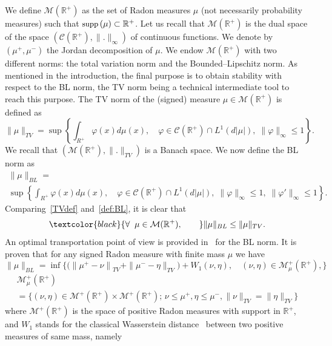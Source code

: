 \documentclass[10pt]{amsart}
\theoremstyle{definition}\newtheorem{defi}[theo]{Definition}\newtheorem{rema}[theo]{Remark}\newtheorem{exam}[theo]{Example}\newtheorem{exem}[theo]{Example}\newtheorem{nota}[theo]{Notation}
\newcommand*\dst{\displaystyle}
\newcommand*\R{\mathbb{R}}
\newcommand*\M{\mathcal{M}}
\newcommand{\clC}{\mathcal{C}}
\newcommand{\comMD}[1]{\textcolor{black}{#1}}
\newcommand*\supp{{\mbox{\small\rm supp}}\,}
\let\oldforall\forall
\renewcommand*{\forall}{\mathrel{\oldforall}}
\begin{document}
We define $\M(\R^+)$ as the set of Radon measures $\mu$ (not necessarily probability measures) such that $\supp(\mu) \subset \R^+$. Let us recall that $\M(\R^+)$ is the dual space of the space $(\clC(\R^+),\|.\|_{\infty})$ of continuous functions. We denote by $(\mu^+,\mu^-)$ the Jordan decomposition of $\mu$.
We endow $\M(\R^+)$ with two different norms: the total variation norm and the Bounded--Lipschitz norm. As mentioned in the introduction, the final purpose is to obtain stability with respect to the BL norm, the TV norm being a technical intermediate tool to reach this purpose.
The TV norm of the (signed) measure $\mu \in \M(\R^+)$ is defined as
\begin{equation}\label{TVdef}
\|\mu\|_{TV} = \sup \left\{\dst\int_{R^+} \varphi(x)d\mu(x), \quad \varphi \in \clC(\R^+)\cap L^1(d|\mu|), \; \|\varphi\|_{\infty} \leq 1\right\}.
\end{equation}
We recall that $(\M(\R^+),\|.\|_{TV})$ is a Banach space. We now define the BL norm as
\begin{multline}\label{def:BL}
\|\mu\|_{BL} =\\
\sup \left\{\dst\int_{R^+} \varphi(x)d\mu(x), \quad \varphi \in \clC(\R^+)\cap L^1(d|\mu|), \; \|\varphi\|_{\infty} \leq 1, \;
\|\varphi '\|_{\infty}\leq 1\right\}.
\end{multline}
Comparing~\eqref{TVdef} and~\eqref{def:BL}, it is clear that
\begin{equation}\label{BL_TV}
\comMD{\forall \; \mu\in \M(\R^+),\qquad} \|\mu\|_{BL} \leq \|\mu\|_{TV}.
\end{equation}
An optimal transportation point of view is provided in~\cite[Proposition~23]{PRT17} for the BL norm. It is proven that for any signed Radon measure with finite mass $\mu$ we have
\begin{equation}\label{BLdef}
\|\mu\|_{BL} =\inf \Big\{ \big(\left\|\mu^+ - \nu\right\|_{TV} +\|\mu^-- \eta\|_{TV}\big)+ W_1(\nu,\eta),\quad (\nu, \eta) \in \M_{ \mu }^+(\R^+),\Big\}
\end{equation}
\begin{multline}\label{BLdef2}
 \M_{ \mu }^+(\R^+)\\
=\Big\{ (\nu, \eta)\in \M^+(\R^+)\times \M^+(\R^+);\, \nu\leq \mu^+, \eta \leq \mu^-, \|\nu\|_{TV}=\|\eta\|_{TV}
\Big\}
\end{multline}
where $\M^+(\R^+)$ is the space of positive Radon measures with support in $\R^+$, and $W_1$ stands for the classical Wasserstein distance~\cite{Villani_topics} between two positive measures of same mass, namely
\end{document}
